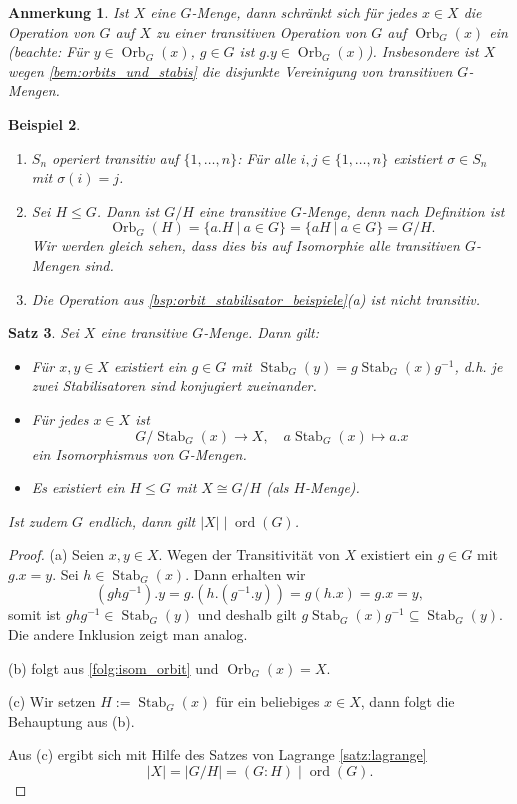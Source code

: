 \documentclass[a4paper, twoside, 11pt, ngerman]{report}
\DeclareMathOperator{\Orb}{Orb}
\DeclareMathOperator{\ord}{ord}
\DeclareMathOperator{\Stab}{Stab}
\theoremstyle{definistyle}
\newtheorem{satz}{Satz}[section]
\newtheorem{anm}[satz]{Anmerkung}
\newtheorem{bsp}[satz]{Beispiel}
\theoremstyle{remark}
\begin{document}
\begin{anm}
Ist $X$ eine $G$-Menge, dann schränkt sich für jedes $x\in X$ die Operation von $G$ auf $X$ zu einer 
transitiven Operation von $G$ auf $\Orb_G(x)$ ein (beachte: Für $y\in\Orb_G(x)$, $g\in G$ ist $g.y\in\Orb_G(x)$). Insbesondere ist $X$ wegen \ref{bem:orbits_und_stabis} die disjunkte Vereinigung
von transitiven $G$-Mengen.
\end{anm}

\begin{bsp}\label{bsp:transitive_operationen}
\begin{enumerate}[label=(\alph*)]
    \item $S_n$ operiert transitiv auf $\{1, \dots, n\}$: Für alle $i, j \in \{1, \dots, n\}$ existiert $\sigma \in S_n$ mit $\sigma(i) = j$.
    \item Sei $H \leq G$. Dann ist $G / H$ eine transitive $G$-Menge, denn nach Definition ist
    \[\Orb_G(H) = \{ a.H \ | \ a \in G\} = \{ aH \ | \ a\in G\} =G / H.\]
    Wir werden gleich sehen, dass dies bis
    auf Isomorphie alle transitiven $G$-Mengen sind.
    \item Die Operation aus \ref{bsp:orbit_stabilisator_beispiele}(a) ist nicht transitiv.
\end{enumerate}
\end{bsp}

\begin{satz}\label{satz:transitive_g_menge}
Sei $X$ eine transitive $G$-Menge. Dann gilt:
\begin{itemize}
    \item[(a)] Für $x, y \in X$ existiert ein $g \in G$ mit $\Stab_G(y) = g \Stab_G(x) g^{-1}$, d.h. je zwei Stabilisatoren sind konjugiert zueinander.
    \item[(b)] Für jedes $x \in X$ ist \[G / \Stab_G(x) \to X, \quad a \Stab_G(x) \mapsto a . x\] ein Isomorphismus von $G$-Mengen.
    \item[(c)] Es existiert ein $H \leq G$ mit $X \cong G / H$ (als $H$-Menge).
\end{itemize}
Ist zudem $G$ endlich, dann gilt $\lvert X \rvert \mid \ord(G)$.
\end{satz}

\begin{proof}
(a) Seien $x, y \in X$. Wegen der Transitivität von $X$ existiert ein $g \in G$ mit $g . x = y$. Sei $h \in \Stab_G(x)$. Dann erhalten wir
\[
(g h g^{-1}) . y = g.(h. (g^{-1} . y)) = g (h . x) = g . x = y,
\]
somit ist $g h g^{-1} \in \Stab_G(y)$ und deshalb gilt $g\Stab_G(x)g^{-1}\subseteq \Stab_G(y)$. Die andere Inklusion zeigt man analog.

(b) folgt aus \ref{folg:isom_orbit} und $\Orb_G(x) = X$.

(c) Wir setzen $H := \Stab_G(x)$ für ein beliebiges $x \in X$, dann folgt die Behauptung aus (b). 

Aus (c) ergibt sich mit Hilfe des Satzes von Lagrange \ref{satz:lagrange}
\[
|X| = |G / H| = (G : H) \mid \ord(G).
\]
\end{proof}
\end{document}
